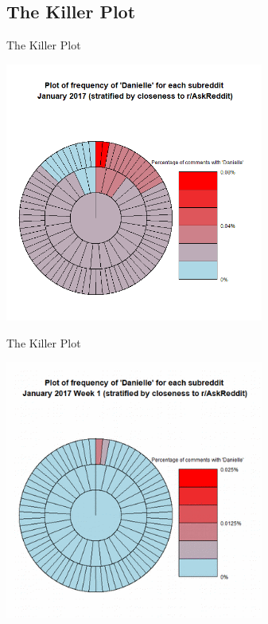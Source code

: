 \documentclass{beamer}
\begin{document}
\subsection{The Killer Plot}

\begin{frame}{The Killer Plot}
\begin{center}
\includegraphics[width=8.5cm,scale=1]{Plots/janmemes}
\end{center}
\end{frame}

\begin{frame}{The Killer Plot}
\begin{center}
\includegraphics[width=8.5cm,scale=1]{Plots/2017_jan_week1}
\end{center}
\end{frame}
\end{document}
